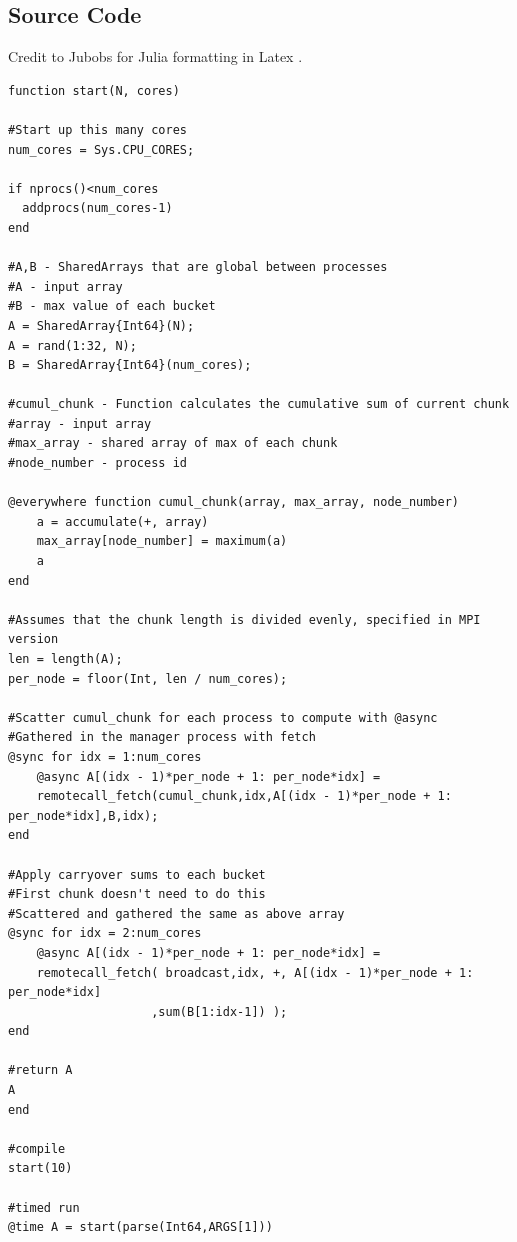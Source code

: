 \documentclass[12pt]{article}
\begin{document}
\subsection{Source Code}
Credit to Jubobs for Julia formatting in Latex \cite{juliaformatting}.
\fontsize{10}{10}
\begin{lstlisting}
function start(N, cores)

#Start up this many cores
num_cores = Sys.CPU_CORES;

if nprocs()<num_cores
  addprocs(num_cores-1)
end

#A,B - SharedArrays that are global between processes
#A - input array
#B - max value of each bucket
A = SharedArray{Int64}(N);
A = rand(1:32, N);
B = SharedArray{Int64}(num_cores);

#cumul_chunk - Function calculates the cumulative sum of current chunk
#array - input array
#max_array - shared array of max of each chunk
#node_number - process id

@everywhere function cumul_chunk(array, max_array, node_number)
    a = accumulate(+, array)
    max_array[node_number] = maximum(a)
    a
end

#Assumes that the chunk length is divided evenly, specified in MPI version
len = length(A);
per_node = floor(Int, len / num_cores);

#Scatter cumul_chunk for each process to compute with @async
#Gathered in the manager process with fetch
@sync for idx = 1:num_cores
    @async A[(idx - 1)*per_node + 1: per_node*idx] = 
    remotecall_fetch(cumul_chunk,idx,A[(idx - 1)*per_node + 1: per_node*idx],B,idx);	
end

#Apply carryover sums to each bucket
#First chunk doesn't need to do this
#Scattered and gathered the same as above array
@sync for idx = 2:num_cores
    @async A[(idx - 1)*per_node + 1: per_node*idx] = 
    remotecall_fetch( broadcast,idx, +, A[(idx - 1)*per_node + 1: per_node*idx] 
    				,sum(B[1:idx-1]) );	
end

#return A
A
end

#compile
start(10)

#timed run
@time A = start(parse(Int64,ARGS[1]))
\end{lstlisting}
\fontsize{12}{12}
\end{document}
